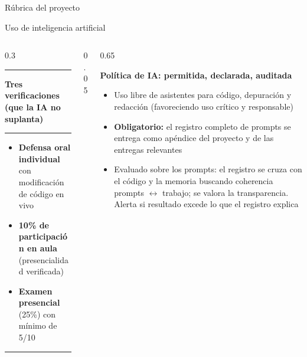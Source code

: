 \documentclass[
  8pt,
  ignorenonframetext,
  aspectratio=169,
  spanish,
]{beamer}
\providecommand{\tightlist}{%
  \setlength{\itemsep}{0pt}\setlength{\parskip}{0pt}}
\begin{document}
\begin{frame}[shrink]{Rúbrica del proyecto}
\end{frame}

\begin{frame}[shrink]{Uso de inteligencia artificial}
\label{uso-de-inteligencia-artificial}
~

\begin{columns}[T]
\begin{column}{0.3\linewidth}
\begin{center}\rule{0.5\linewidth}{0.5pt}\end{center}

\textbf{Tres verificaciones (que la IA no suplanta)}

\begin{center}\rule{0.5\linewidth}{0.5pt}\end{center}

\begin{itemize}
\tightlist
\item
  \textbf{Defensa oral individual} con modificación de código en vivo
\item
  \textbf{10\% de participación en aula} (presencialidad verificada)
\item
  \textbf{Examen presencial} (25\%) con mínimo de 5/10
\end{itemize}

\begin{center}\rule{0.5\linewidth}{0.5pt}\end{center}
\end{column}

\begin{column}{0.05\linewidth}
\end{column}

\begin{column}{0.65\linewidth}
~

\textbf{Política de IA: permitida, declarada, auditada}

\begin{itemize}
\tightlist
\item
  Uso libre de asistentes para código, depuración y redacción
  (favoreciendo uso crítico y responsable)
\item
  \textbf{Obligatorio:} el registro completo de prompts se entrega como
  apéndice del proyecto y de las entregas relevantes
\item
  Evaluado sobre los prompts: el registro se cruza con el código y la
  memoria buscando coherencia prompts \(\leftrightarrow\) trabajo; se
  valora la transparencia. Alerta si resultado excede lo que el registro
  explica
\end{itemize}
\end{column}
\end{columns}


\end{frame}
\end{document}
